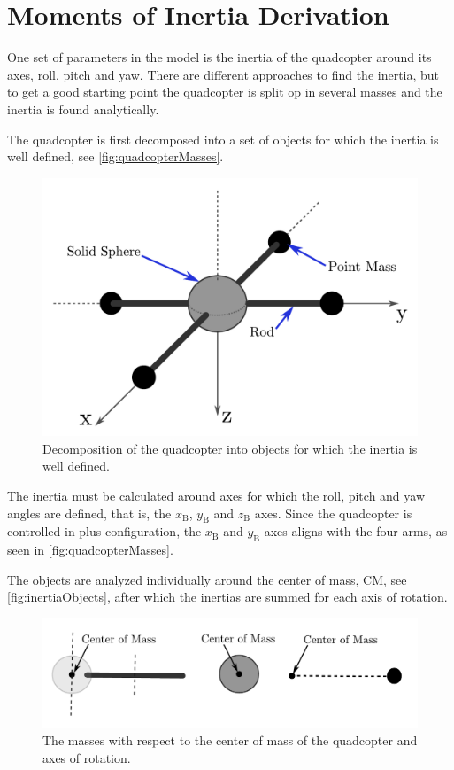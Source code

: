 \chapter{Moments of Inertia Derivation}\label{app:Inertia}
One set of parameters in the model is the inertia of the quadcopter around its axes, roll, pitch and yaw. There are different approaches to find the inertia, but to get a good starting point the quadcopter is split op in several masses and the inertia is found analytically.

The quadcopter is first decomposed into a set of objects for which the inertia is well defined, see \autoref{fig:quadcopterMasses}.

\begin{figure}[H]
  \centering
  \includegraphics[width=.6\linewidth]{figures/quadcopterMasses}
  \caption{Decomposition of the quadcopter into objects for which the inertia is well defined.}
  \label{fig:quadcopterMasses}
\end{figure}

The inertia must be calculated around axes for which the roll, pitch and yaw angles are defined, that is, the $x_\mathrm{B}$, $y_\mathrm{B}$ and $z_\mathrm{B}$ axes. Since the quadcopter is controlled in plus configuration, the $x_\mathrm{B}$ and $y_\mathrm{B}$ axes aligns with the four arms, as seen in \autoref{fig:quadcopterMasses}.

The objects are analyzed individually around the center of mass, CM, see \autoref{fig:inertiaObjects}, after which the inertias are summed for each axis of rotation.

\begin{figure}[H]
  \centering
  \includegraphics[width=.9\linewidth]{figures/inertiaObjects}
  \caption{The masses with respect to the center of mass of the quadcopter and axes of rotation.}
  \label{fig:inertiaObjects}
\end{figure}

